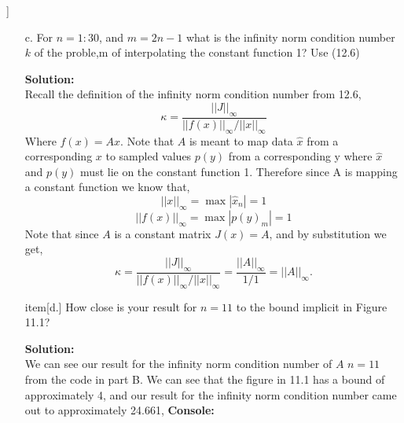 \documentclass[12pt]{article}
\makeatletter
\theoremstyle{homework}
\newenvironment{exercise}[1]
{\def\@currentlabel{#1}\exercisecore}
{\endexercisecore}
\newcommand{\localhead}[1]{\par\smallskip\noindent\textbf{#1}\nobreak\\}%
\newcommand\solution{\localhead{Solution:}}
\makeatother
\begin{document}
\begin{exercise}[12.2]
\begin{enumerate}
    \item[c.] For $n = 1:30$, and $m = 2n - 1$ what is the infinity norm condition number $k$ of the proble,m of interpolating 
    the constant function 1? Use (12.6)\\
    \solution Recall the definition of the infinity norm condition number from 12.6, 
    \begin{equation*}
      \kappa = \dfrac{||J||_{\infty}}{||f(x)||_{\infty}/ ||x||_{\infty}}
    \end{equation*}
    Where $f(x) = Ax$. Note that $A$ is meant to map data $\hat{x}$ from a corresponding $x$ to sampled values $p(y)$ from a corresponding y where $\hat{x}$ and $p(y)$
    must lie on the constant function 1. Therefore since 
    A is mapping a constant function we know that,
    \begin{equation*}
      ||x||_{\infty} = \max{|\hat{x}_n|} = 1
    \end{equation*}
    \begin{equation*}
      ||f(x)||_{\infty} = \max{|p(y)_m|} = 1
    \end{equation*}
    Note that since $A$ is a constant matrix $J(x) = A$, and by substitution we get, 
    \begin{equation*}
      \kappa = \dfrac{||J||_{\infty}}{||f(x)||_{\infty}/ ||x||_{\infty}} = \dfrac{||A||_{\infty}}{1/1} = ||A||_{\infty}.
    \end{equation*}
    \vspace{.25in}




    item[d.] How close is your result for $n = 11$ to the bound implicit in Figure 11.1?\\
    \solution We can see our result for the infinity norm condition number of $A$ $n = 11$ from the code in part B. We can see that the 
    figure in 11.1 has a bound of approximately 4, and our result for the infinity norm condition number came out to approximately 24.661,
    \textbf{Console:}
    \begin{center}
      
    \end{center}
    \vspace{.25in}
    


  \end{enumerate}
\end{exercise}
  \vspace{1in}
\end{document}
